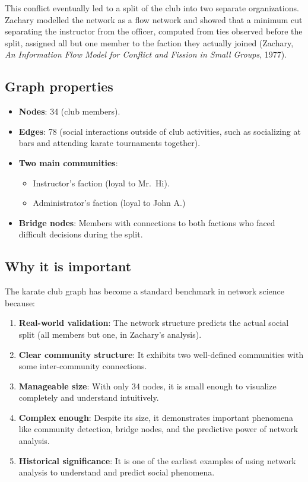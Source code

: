 \begin{notechapter}
\begin{remark}
This conflict eventually led to a split of the club into two separate organizations. Zachary modelled the network as a flow network and showed that a minimum cut separating the instructor from the officer, computed from ties observed before the split, assigned all but one member to the faction they actually joined (Zachary, \emph{An Information Flow Model for Conflict and Fission in Small Groups}, 1977).
\end{remark}

\subsection{Graph properties}

\begin{itemize}
    \item \textbf{Nodes}: 34 (club members).
    \item \textbf{Edges}: 78 (social interactions outside of club activities, such as socializing at bars and attending karate tournaments together).
    \item \textbf{Two main communities}:
    \begin{itemize}
        \item Instructor's faction (loyal to Mr.\ Hi).
        \item Administrator's faction (loyal to John A.)
    \end{itemize}
    \item \textbf{Bridge nodes}: Members with connections to both factions who faced difficult decisions during the split.
\end{itemize}

\subsection{Why it is important}

The karate club graph has become a standard benchmark in network science because:

\begin{enumerate}
    \item \textbf{Real-world validation}: The network structure predicts the actual social split (all members but one, in Zachary's analysis).
    \item \textbf{Clear community structure}: It exhibits two well-defined communities with some inter-community connections.
    \item \textbf{Manageable size}: With only 34 nodes, it is small enough to visualize completely and understand intuitively.
    \item \textbf{Complex enough}: Despite its size, it demonstrates important phenomena like community detection, bridge nodes, and the predictive power of network analysis.
    \item \textbf{Historical significance}: It is one of the earliest examples of using network analysis to understand and predict social phenomena.
\end{enumerate}


\end{notechapter}
